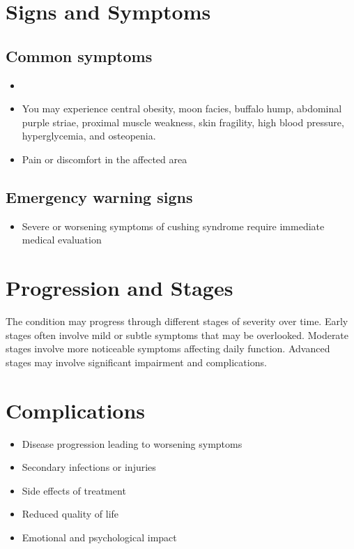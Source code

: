 \section{Signs and Symptoms}

\subsection{Common symptoms}
\begin{itemize}[noitemsep]
  \item \item You may experience central obesity, moon facies, buffalo hump, abdominal purple striae, proximal muscle weakness, skin fragility, high blood pressure, hyperglycemia, and osteopenia.

  \item Pain or discomfort in the affected area
  \end{itemize}

\subsection{Emergency warning signs}
\begin{itemize}[noitemsep]
  \item Severe or worsening symptoms of cushing syndrome require immediate medical evaluation
\end{itemize}
\section{Progression and Stages}
The condition may progress through different stages of severity over time. Early stages often involve mild or subtle symptoms that may be overlooked. Moderate stages involve more noticeable symptoms affecting daily function. Advanced stages may involve significant impairment and complications.
\section{Complications}
\begin{itemize}[noitemsep]
  \item Disease progression leading to worsening symptoms
  \item Secondary infections or injuries
  \item Side effects of treatment
  \item Reduced quality of life
  \item Emotional and psychological impact
\end{itemize}
